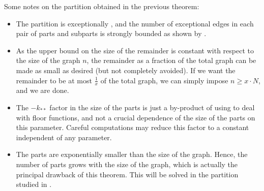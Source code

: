         \begin{remark}
            Some notes on the partition obtained in the previous theorem:
            \begin{itemize}
                \item The partition is exceptionally \regular, and the number of exceptional edges in each pair of parts
                    and subparts is strongly bounded as shown by .
                \item As the upper bound on the size of the remainder is constant with respect to the size of the graph $n$,
                    the remainder as a fraction of the total graph can be made as small as desired (but not completely avoided).
                    If we want the remainder to be at most $\frac{1}{x}$ of the total graph, we can simply impose
                    $n \geq x \cdot N$, and we are done.
                \item The $- k_{**}$ factor in the size of the parts is just a by-product of using 
                    to deal with floor functions, and not a crucial dependence of the size of the parts
                    on this parameter.
                    Careful computations may reduce this factor to a constant independent of any parameter.
                \item The parts are exponentially smaller than the size of the graph.
                    Hence, the number of parts grows with the size of the graph, which is actually the principal drawback of
                    this theorem.
                    This will be solved in the partition studied in .
            \end{itemize}
        \end{remark}

